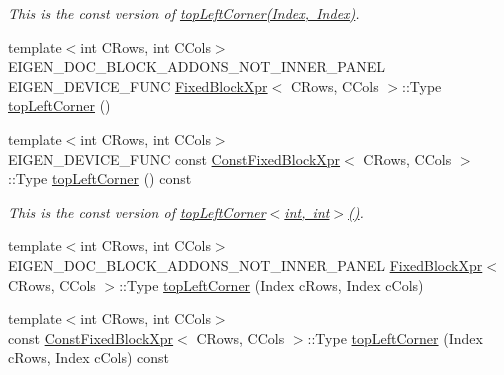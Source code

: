\begin{DoxyCompactItemize}
\begin{DoxyCompactList}\small\item\em This is the const version of \mbox{\hyperlink{class_eigen_1_1_dense_base_a5fe4cee91037d9586f72bafa5fdd4bd2}{top\+Left\+Corner(\+Index, Index)}}. \end{DoxyCompactList}\item 
{\footnotesize template$<$int C\+Rows, int C\+Cols$>$ }\\E\+I\+G\+E\+N\+\_\+\+D\+O\+C\+\_\+\+B\+L\+O\+C\+K\+\_\+\+A\+D\+D\+O\+N\+S\+\_\+\+N\+O\+T\+\_\+\+I\+N\+N\+E\+R\+\_\+\+P\+A\+N\+EL E\+I\+G\+E\+N\+\_\+\+D\+E\+V\+I\+C\+E\+\_\+\+F\+U\+NC \mbox{\hyperlink{struct_eigen_1_1_dense_base_1_1_fixed_block_xpr}{Fixed\+Block\+Xpr}}$<$ C\+Rows, C\+Cols $>$\+::Type \mbox{\hyperlink{class_eigen_1_1_dense_base_ae462d182957c74a99abd62967f208434}{top\+Left\+Corner}} ()
\item 
\mbox{\label{class_eigen_1_1_dense_base_ad30a81731db0af465e68a69d51560d9b}} 
{\footnotesize template$<$int C\+Rows, int C\+Cols$>$ }\\E\+I\+G\+E\+N\+\_\+\+D\+E\+V\+I\+C\+E\+\_\+\+F\+U\+NC const \mbox{\hyperlink{struct_eigen_1_1_dense_base_1_1_const_fixed_block_xpr}{Const\+Fixed\+Block\+Xpr}}$<$ C\+Rows, C\+Cols $>$\+::Type \mbox{\hyperlink{class_eigen_1_1_dense_base_ad30a81731db0af465e68a69d51560d9b}{top\+Left\+Corner}} () const
\begin{DoxyCompactList}\small\item\em This is the const version of \mbox{\hyperlink{class_eigen_1_1_dense_base_ae462d182957c74a99abd62967f208434}{top\+Left\+Corner$<$int, int$>$()}}. \end{DoxyCompactList}\item 
{\footnotesize template$<$int C\+Rows, int C\+Cols$>$ }\\E\+I\+G\+E\+N\+\_\+\+D\+O\+C\+\_\+\+B\+L\+O\+C\+K\+\_\+\+A\+D\+D\+O\+N\+S\+\_\+\+N\+O\+T\+\_\+\+I\+N\+N\+E\+R\+\_\+\+P\+A\+N\+EL \mbox{\hyperlink{struct_eigen_1_1_dense_base_1_1_fixed_block_xpr}{Fixed\+Block\+Xpr}}$<$ C\+Rows, C\+Cols $>$\+::Type \mbox{\hyperlink{class_eigen_1_1_dense_base_aa70d0b21877ab8a5992ab103786b788e}{top\+Left\+Corner}} (Index c\+Rows, Index c\+Cols)
\item 
\mbox{\label{class_eigen_1_1_dense_base_adce933f12d5ff50ac09c11e46a4f6351}} 
{\footnotesize template$<$int C\+Rows, int C\+Cols$>$ }\\const \mbox{\hyperlink{struct_eigen_1_1_dense_base_1_1_const_fixed_block_xpr}{Const\+Fixed\+Block\+Xpr}}$<$ C\+Rows, C\+Cols $>$\+::Type \mbox{\hyperlink{class_eigen_1_1_dense_base_adce933f12d5ff50ac09c11e46a4f6351}{top\+Left\+Corner}} (Index c\+Rows, Index c\+Cols) const

\end{DoxyCompactItemize}
